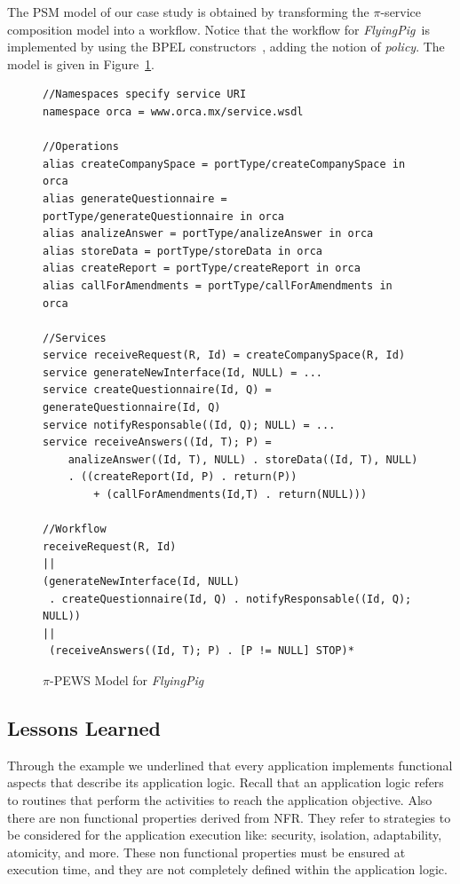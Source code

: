 \documentclass[12pt,twoside]{article}
\theoremstyle{plain}
\theoremstyle{plain}
\def\FlyingPig{\textsl{FlyingPig}\xspace}
\begin{document}
\begin{multicols}{2}
The  PSM model of our case study is obtained by transforming the $\pi$-service composition model into a workflow.
Notice that the workflow for \FlyingPig\ is implemented by using the BPEL constructors~\cite{BPEL}, adding the notion of \textit{policy}.
The model is given in Figure~\ref{fig:piPEWSFlyingPig}.

\begin{figure}
\begin{verbatim}
//Namespaces specify service URI
namespace orca = www.orca.mx/service.wsdl

//Operations
alias createCompanySpace = portType/createCompanySpace in orca
alias generateQuestionnaire = portType/generateQuestionnaire in orca
alias analizeAnswer = portType/analizeAnswer in orca
alias storeData = portType/storeData in orca
alias createReport = portType/createReport in orca
alias callForAmendments = portType/callForAmendments in orca

//Services
service receiveRequest(R, Id) = createCompanySpace(R, Id)
service generateNewInterface(Id, NULL) = ...
service createQuestionnaire(Id, Q) = generateQuestionnaire(Id, Q)
service notifyResponsable((Id, Q); NULL) = ...
service receiveAnswers((Id, T); P) =
	analizeAnswer((Id, T), NULL) . storeData((Id, T), NULL)
	. ((createReport(Id, P) . return(P)) 
	    + (callForAmendments(Id,T) . return(NULL)))

//Workflow
receiveRequest(R, Id)
||
(generateNewInterface(Id, NULL)
 . createQuestionnaire(Id, Q) . notifyResponsable((Id, Q); NULL))
||
 (receiveAnswers((Id, T); P) . [P != NULL] STOP)*	
\end{verbatim}
\caption{$\pi$-PEWS Model for \FlyingPig}\label{fig:piPEWSFlyingPig}
\end{figure}



\subsection{Lessons Learned}

Through the example we underlined that every application implements functional aspects that describe its application logic.
Recall that an application logic refers to routines that perform the activities to reach the application objective.
Also there are non functional properties derived from NFR. They refer to strategies to be considered for the application execution like: security, isolation, adaptability, atomicity, and more.
These non functional properties must be ensured at execution time, and they are not completely defined within the application logic.


\end{multicols}
\end{document}
